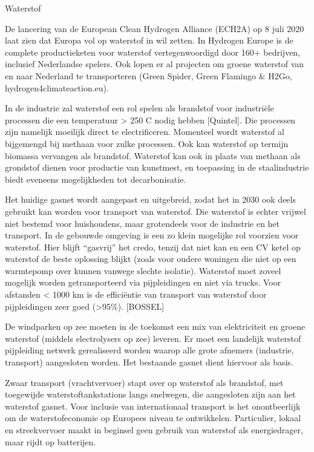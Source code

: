 \begin{voorstel}{Waterstof}
\begin{overwegingen}
De lancering van de European Clean Hydrogen Alliance (ECH2A) op 8 juli 2020 laat zien dat Europa vol op waterstof in wil zetten. In Hydrogen Europe is de complete productieketen voor waterstof vertegenwoordigd door 160+ bedrijven, inclusief Nederlandse spelers. Ook lopen er al projecten om groene waterstof van en naar Nederland te transporteren (Green Spider, Green Flamingo \& H2Go, hydrogen4climateaction.eu).

In de industrie zal waterstof een rol spelen als brandstof voor industriële processen die een temperatuur > 250 C nodig hebben [Quintel]. Die processen zijn namelijk moeilijk direct te electrificeren. Momenteel wordt waterstof al bijgemengd bij methaan voor zulke processen. Ook kan waterstof op termijn biomassa vervangen als brandstof. Waterstof kan ook in plaats van methaan als grondstof dienen voor productie van kunstmest, en toepassing in de staalindustrie biedt eveneens mogelijkheden tot decarbonisatie.

Het huidige gasnet wordt aangepast en uitgebreid, zodat het in 2030 ook deels gebruikt kan worden voor transport van waterstof. Die waterstof is echter vrijwel niet bestemd voor huishoudens, maar grotendeels voor de industrie en het transport. In de gebouwde omgeving is een zo klein mogelijke rol voorzien voor waterstof. Hier blijft “gasvrij” het credo, tenzij dat niet kan en een CV ketel op waterstof de beste oplossing blijkt (zoals voor oudere woningen die niet op een warmtepomp over kunnen vanwege slechte isolatie). Waterstof moet zoveel mogelijk worden getransporteerd via pijpleidingen en niet via trucks. Voor afstanden < 1000 km is de efficiëntie van transport van waterstof door pijpleidingen zeer goed (>95\%). [BOSSEL]

\end{overwegingen}

\begin{aanbevelingen}
De windparken op zee moeten in de toekomst een mix van elektriciteit en groene waterstof (middels electrolysers op zee) leveren.
Er moet een landelijk waterstof pijpleiding netwerk gerealiseerd worden waarop alle grote afnemers (industrie, transport) aangesloten worden. Het bestaande gasnet dient hiervoor als basis.

Zwaar transport (vrachtvervoer) stapt over op waterstof als brandstof, met toegewijde waterstoftankstations langs snelwegen, die aangesloten zijn aan het waterstof gasnet. Voor inclusie van internationaal transport is het onontbeerlijk om de waterstofeconomie op Europees niveau te ontwikkelen. Particulier, lokaal en streekvervoer maakt in beginsel geen gebruik van waterstof als energiedrager, maar rijdt op batterijen.


\end{aanbevelingen}
\end{voorstel}
